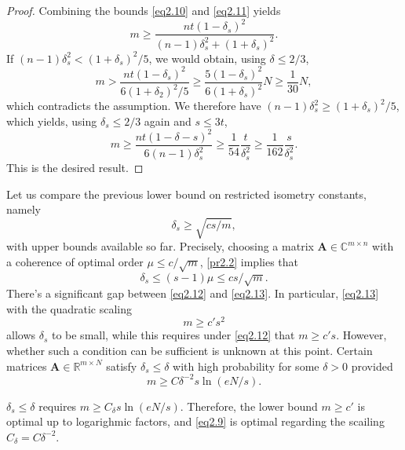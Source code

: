 \begin{proof}
    Combining the bounds \cref{eq2.10} and \cref{eq2.11} yields
    \[
        m \geq \dfrac{nt(1- \delta_s)^2}{(n-1)\delta_s^2 + (1+\delta_s)^2}.
    \]
    If $(n-1)\delta_s^2 < (1 + \delta_s)^2/5$, we would obtain, using $\delta \leq 2/3$,
    \[
        m > \dfrac{nt(1-\delta_s)^2}{6(1 + \delta_2)^2/5} \geq \dfrac{5(1-\delta_s)^2}{6(1+ \delta_s)^2} N \geq \dfrac{1}{30}N,
    \]
    which contradicts the assumption. We therefore have $(n-1)\delta_s^2 \geq (1+\delta_s)^2 /5$, which yields, using $\delta_s \leq 2/3$ again and $s \leq 3t$,
    \[
        m \geq \dfrac{nt(1-\delta-s)^2}{6(n-1)\delta_s^2} \geq \dfrac{1}{54} \dfrac{t}{\delta_s^2} \geq \dfrac{1}{162} \dfrac{s}{\delta_s^2}.
    \]
    This is the desired result.
\end{proof}

Let us compare the previous lower bound on restricted isometry constants, namely
\begin{equation}
    \delta_s \geq \sqrt{cs/m},
    \label{eq2.12}
\end{equation}
with upper bounds available so far. Precisely, choosing a matrix $\mathbf{A} \in \mathbb{C}^{m \times n}$ with a coherence of optimal order $\mu \leq c/\sqrt{m}$, \cref{pr2.2} implies that
\begin{equation}
    \delta_s \leq (s-1)\mu \leq cs/\sqrt{m}.
    \label{eq2.13}
\end{equation}
There's a significant gap between \cref{eq2.12} and \cref{eq2.13}. In particular, \cref{eq2.13} with the quadratic scaling
\begin{equation}
    m \geq c's^2
    \label{eq2.14}
\end{equation}
allows $\delta_s$ to be small, while this requires under \cref{eq2.12} that $m \geq c's$. However, whether such a condition can be sufficient is unknown at this point. Certain matrices $\mathbf{A} \in \mathbb{R}^{m \times N}$ satisfy $\delta_s \leq \delta$ with high probability for some $\delta > 0$ provided
\begin{equation}
    m \geq C \delta^{-2} s \ln(eN/s).
    \label{eq2.15}
\end{equation}

$\delta_s \leq \delta$ requires $m \geq C_{\delta}s\ln(eN/s)$. Therefore, the lower bound $m \geq c'$ is optimal up to logarighmic factors, and \cref{eq2.9} is optimal regarding the scailing $C_{\delta} = C \delta^{-2}$.

